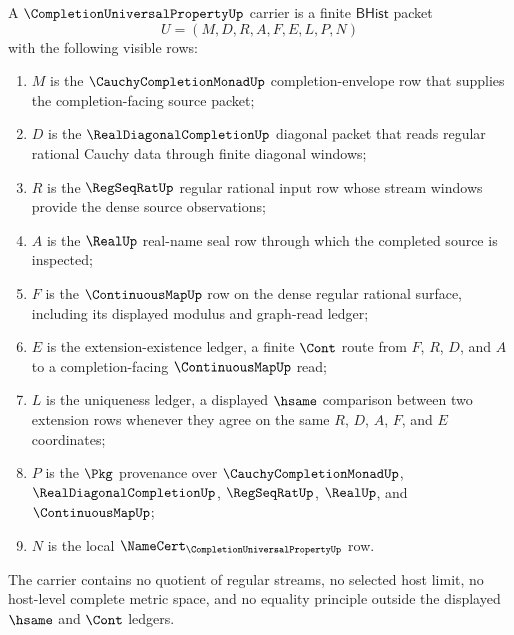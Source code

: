 \begin{definition}
\label{def:completion-universal-property-carrier}
A $\CompletionUniversalPropertyUp$ carrier is a finite $\mathsf{BHist}$ packet
$$
U=(M,D,R,A,F,E,L,P,N)
$$
with the following visible rows:
\begin{enumerate}
\item $M$ is the $\CauchyCompletionMonadUp$ completion-envelope row that supplies the completion-facing source packet;
\item $D$ is the $\RealDiagonalCompletionUp$ diagonal packet that reads regular rational Cauchy data through finite diagonal windows;
\item $R$ is the $\RegSeqRatUp$ regular rational input row whose stream windows provide the dense source observations;
\item $A$ is the $\RealUp$ real-name seal row through which the completed source is inspected;
\item $F$ is the $\ContinuousMapUp$ row on the dense regular rational surface, including its displayed modulus and graph-read ledger;
\item $E$ is the extension-existence ledger, a finite $\Cont$ route from $F$, $R$, $D$, and $A$ to a completion-facing $\ContinuousMapUp$ read;
\item $L$ is the uniqueness ledger, a displayed $\hsame$ comparison between two extension rows whenever they agree on the same $R$, $D$, $A$, $F$, and $E$ coordinates;
\item $P$ is the $\Pkg$ provenance over $\CauchyCompletionMonadUp$, $\RealDiagonalCompletionUp$, $\RegSeqRatUp$, $\RealUp$, and $\ContinuousMapUp$;
\item $N$ is the local $\NameCert_{\CompletionUniversalPropertyUp}$ row.
\end{enumerate}
The carrier contains no quotient of regular streams, no selected host limit, no host-level complete metric space, and no equality principle outside the displayed $\hsame$ and $\Cont$ ledgers.
\end{definition}

